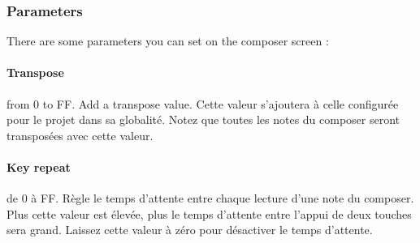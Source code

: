 \subsubsection{Parameters}

There are some parameters you can set on the composer screen :


\paragraph{Transpose} from 0 to FF.
Add a transpose value.
Cette valeur s'ajoutera à celle configurée pour le projet dans sa globalité.
Notez que toutes les notes du composer seront transposées avec cette valeur.

\paragraph{Key repeat} de 0 à FF.
Règle le temps d'attente entre chaque lecture d'une note du composer.
Plus cette valeur est élevée, plus le temps d'attente entre l'appui de deux touches sera grand.
Laissez cette valeur à zéro pour désactiver le temps d'attente.
